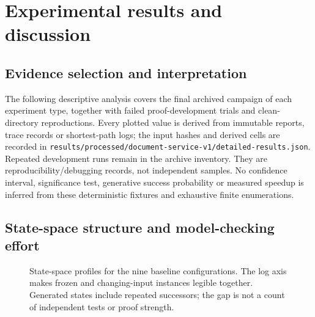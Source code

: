 \documentclass[pdflatex,sn-mathphys-num]{sn-jnl}
\theoremstyle{thmstyleone}
\theoremstyle{thmstylethree}
\theoremstyle{thmstyletwo}
\begin{document}
\section{Experimental results and discussion}\label{sec:results}

\subsection{Evidence selection and interpretation}

The following descriptive analysis covers the final archived campaign of each experiment type, together with failed proof-development trials and clean-directory reproductions. Every plotted value is derived from immutable reports, trace records or shortest-path logs; the input hashes and derived cells are recorded in \texttt{results/processed/document-service-v1/detailed-results.json}. Repeated development runs remain in the archive inventory. They are reproducibility/debugging records, not independent samples. No confidence interval, significance test, generative success probability or measured speedup is inferred from these deterministic fixtures and exhaustive finite enumerations.

\subsection{State-space structure and model-checking effort}

\begin{figure}[tbp]
\centering
{}
\caption{State-space profiles for the nine baseline configurations. The log axis makes frozen and changing-input instances legible together. Generated states include repeated successors; the gap is not a count of independent tests or proof strength.}\label{fig:state-space}
\end{figure}
\end{document}
